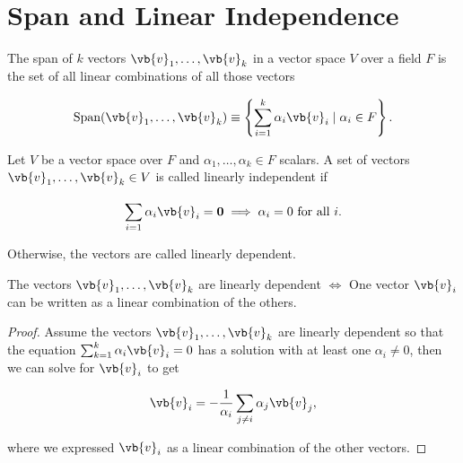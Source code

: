 \documentclass[a4paper,12pt]{report}
\begin{document}
\section{Span and Linear Independence}

\begin{definition}
    The span of \(k\) vectors \(\vb{v} _{1} , \ldots , \vb{v} _{k} \) in a vector space \(V\) over a field \(F\) is the set of all linear combinations of all those vectors
\end{definition}

\begin{equation}
    \text{Span} (\vb{v} _{1}, \ldots ,\vb{v} _{k}  ) \equiv  \left\{\sum_{i=1}^{k} \alpha _{i}\vb{v} _{i} \mid  \alpha _{i}\in F    \right\}.
\end{equation}

\begin{definition}
Let \(V\) be a vector space over \(F\) and \(\alpha _{1}, \ldots , \alpha _{k} \in  F  \) scalars. A set of vectors \(\vb{v} _{1}, \ldots , \vb{v} _{k} \in V\) is called linearly independent if 

\begin{equation}
    \sum_{i=1}^{} \alpha _{i} \vb{v} _{i} = \boldsymbol{0} \implies \alpha _{i} = 0 \text{ for all } i.      
\end{equation}

Otherwise, the vectors are called linearly dependent. 
\end{definition}

\begin{corollary}
The vectors \(\vb{v} _{1}, \ldots , \vb{v} _{k}  \) are linearly dependent \(\iff \) One vector \(\vb{v} _{i} \) can be written as a linear combination of the others. 
\end{corollary}

\begin{proof}
Assume the vectors \(\vb{v} _{1}, \ldots , \vb{v} _{k}  \) are linearly dependent so that the equation \(\sum_{k=1}^{k} \alpha _{i} \vb{v} _{i}  = 0\) has a solution with at least one \(\alpha _{i} \neq 0 \), then we can solve for \(\vb{v} _{i} \) to get

\begin{equation}
    \vb{v} _{i} = -\frac{1}{\alpha _{i} } \sum_{j \neq i}^{} \alpha _{j} \vb{v} _{j} ,    
\end{equation}

where we expressed \(\vb{v} _{i} \) as a linear combination of the other vectors.

\end{proof}
\end{document}
